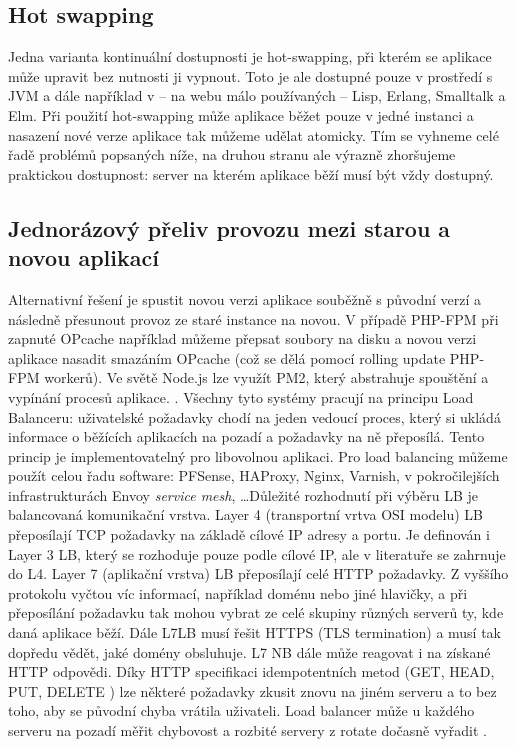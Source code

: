         \subsection{Hot swapping}
            Jedna varianta kontinuální dostupnosti je hot-swapping, při kterém se aplikace může upravit bez nutnosti ji vypnout. Toto je ale dostupné pouze v prostředí s JVM a dále například v -- na webu málo používaných -- Lisp, Erlang, Smalltalk a Elm. Při použití hot-swapping může aplikace běžet pouze v jedné instanci a nasazení nové verze aplikace tak můžeme udělat atomicky. Tím se vyhneme celé řadě problémů popsaných níže, na druhou stranu ale výrazně zhoršujeme praktickou dostupnost: server na kterém aplikace běží musí být vždy dostupný.

        \subsection{Jednorázový přeliv provozu mezi starou a novou aplikací}
            Alternativní řešení je spustit novou verzi aplikace souběžně s původní verzí a následně přesunout provoz ze staré instance na novou. V případě PHP-FPM při zapnuté OPcache například můžeme přepsat soubory na disku a novou verzi aplikace nasadit smazáním OPcache (což se dělá pomocí rolling update PHP-FPM workerů). Ve světě Node.js lze využít PM2, který abstrahuje spouštění a vypínání procesů aplikace. . Všechny tyto systémy pracují na principu Load Balanceru: uživatelské požadavky chodí na jeden vedoucí proces, který si ukládá informace o běžících aplikacích na pozadí a požadavky na ně přeposílá. Tento princip je implementovatelný pro libovolnou aplikaci. Pro load balancing můžeme použít celou řadu software: PFSense, HAProxy, Nginx, Varnish, v pokročilejších infrastrukturách Envoy \textit{service mesh}, \ldots Důležité rozhodnutí při výběru LB je balancovaná komunikační vrstva. Layer 4 (transportní vrtva OSI modelu) LB přeposílají TCP požadavky na základě cílové IP adresy a portu. Je definován i Layer 3 LB, který se rozhoduje pouze podle cílové IP, ale v literatuře se zahrnuje do L4. Layer 7 (aplikační vrstva) LB přeposílají celé HTTP požadavky. Z vyššího protokolu vyčtou víc informací, například doménu nebo jiné hlavičky, a při přeposílání požadavku tak mohou vybrat ze celé skupiny různých serverů ty, kde daná aplikace běží. Dále L7LB musí řešit HTTPS (TLS termination) a musí tak dopředu vědět, jaké domény obsluhuje. L7 NB dále může reagovat i na získané HTTP odpovědi. Díky HTTP specifikaci idempotentních metod (GET, HEAD, PUT, DELETE \cite{http-idempotent}) lze některé požadavky zkusit znovu na jiném serveru a to bez toho, aby se původní chyba vrátila uživateli. Load balancer může u každého serveru na pozadí měřit chybovost a rozbité servery z rotate dočasně vyřadit .

